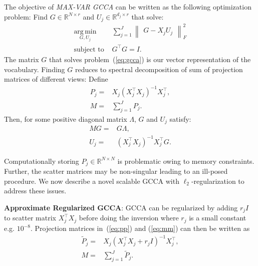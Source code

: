 \documentclass[11pt]{article}
\begin{document}
The objective of \emph{MAX-VAR GCCA} can be written as the following optimization problem:
 Find $G \in \mathbb{R}^{N\times r}$ and $U_j \in
\mathbb{R}^{d_j \times r}$ that solve:
\begin{equation}
  \label{eq:gcca}
\begin{split}
  \operatorname*{\arg\,\min}_{G,U_j} & \sum_{j=1}^J \begin{Vmatrix} G - X_jU_j \end{Vmatrix}^2_F \\
  \text{subject to } & G^\top G = I.
\end{split}
\end{equation}
The matrix $G$ that solves problem~(\ref{eq:gcca}) is our vector representation of the vocabulary. Finding $G$ reduces to spectral decomposition of sum of projection matrices of different views: Define
\begin{align}
P_j =& X_j(X_j^\top X_j)^{-1}X_j^\top, \label{eq:pp}\\
M =& \sum_{j=1}^J P_j. \label{eq:mm}
\end{align}
Then, for some positive diagonal matrix $\Lambda$, $G$ and $U_j$ satisfy:
\begin{align}
M G =& G \Lambda,\\
U_j =& \left(X_j^\top X_j\right)^{-1} X_j^\top G.
\end{align}


Computationally storing $P_j \in \mathbb{R}^{N \times N}$ is
problematic owing to memory constraints.  Further, the scatter
matrices may be non-singular leading to an ill-posed procedure.
We now describe a novel scalable GCCA with $\ell_2$-regularization to address these issues.

\noindent\textbf{Approximate Regularized GCCA}: GCCA can be regularized by adding $r_jI$ to
scatter matrix $X_j^\top X_j$ before doing the inversion where
$r_j$ is a small constant e.g. $10^{-8}$.
Projection matrices in~(\ref{eq:pp}) and (\ref{eq:mm}) can then be written as
\begin{align}
  \widetilde{P}_{j} =& X_j(X_j^\top X_j+r_jI)^{-1}X_j^\top, \label{eq:6}\\
  M =& \sum_{j=1}^J \widetilde{P}_{j}. \label{eq:mmm}
\end{align}
\end{document}
